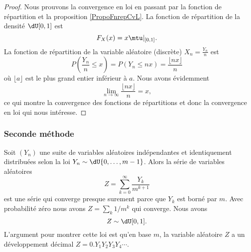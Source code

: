 \begin{proof}
    Nous prouvons la convergence en loi en passant par la fonction de répartition et la proposition \ref{PropoFnrepCvL}. La fonction de répartition de la densité \( \dU[0,1]\) est 
    \begin{equation}
        F_X(x)=x\mtu|_{\mathopen[ 0 , 1 \mathclose]}.
    \end{equation}
    La fonction de répartition de la variable aléatoire (discrète) \( X_n=\frac{ Y_n }{ n }\) est
    \begin{equation}
        P(\frac{ Y_n }{ n }\leq x)=P(Y_n\leq nx)=\frac{ \lfloor nx \rfloor }{ n }
    \end{equation}
    où \( \lfloor a\rfloor\) est le plus grand entier inférieur à \( a\). Nous avons évidemment 
    \begin{equation}
        \lim_{n\to \infty} \frac{ \lfloor nx\rfloor }{ n }=x,
    \end{equation}
    ce qui montre la convergence des fonctions de répartitions et donc la convergence en loi qui nous intéresse.
\end{proof}

\subsubsection{Seconde méthode}

Soit \( (Y_n)\) une suite de variables aléatoires indépendantes et identiquement distribuées selon la loi \( Y_n\sim\dU\{ 0,\ldots,m-1 \}\). Alors la série de variables aléatoires
\begin{equation}
    Z=\sum_{k=0}^{\infty}\frac{ Y_k }{ m^{k+1} }
\end{equation}
est une série qui converge presque surement parce que \( Y_k\) est borné par \( m\). Avec probabilité zéro nous avons \( Z=\sum_k1/m^k\) qui converge. Nous avons
\begin{equation}
    Z\sim\dU\mathopen[ 0 , 1 \mathclose].
\end{equation}
L'argument pour montrer cette loi est qu'en base \( m\), la variable aléatoire \( Z\) a un développement décimal \( Z=0.Y_1Y_2Y_3Y_4\cdots\).

